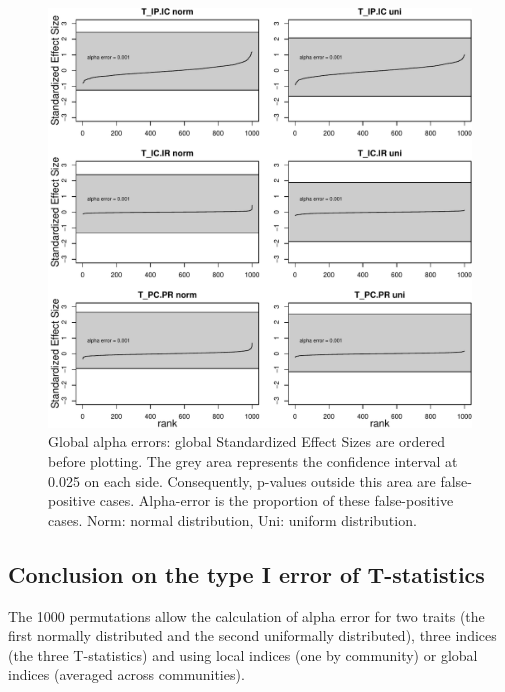 \documentclass[12pt]{article}\usepackage[]{graphicx}\usepackage[]{color}
\makeatletter
\def\maxwidth{ %
  \ifdim\Gin@nat@width>\linewidth
    \linewidth
  \else
    \Gin@nat@width
  \fi
}
\newenvironment{knitrout}{}{} %
\makeatother
\begin{document}
\begin{knitrout}
\begin{figure}
{\centering \includegraphics[width=\maxwidth]{figure/No_filter_summary_plot-1} 

}

\caption[Global alpha errors]{Global alpha errors: global Standardized Effect Sizes are ordered before plotting. The grey area represents the confidence interval at 0.025 on each side. Consequently, p-values outside this area are false-positive cases. Alpha-error is the proportion of these false-positive cases. Norm: normal distribution, Uni: uniform distribution.}\label{fig:No_filter_summary_plot}
\end{figure}


\end{knitrout}


\clearpage
  \subsection {Conclusion on the type I error of T-statistics}

The 1000 permutations allow the calculation of alpha error for two traits (the first normally distributed and the second uniformally distributed), three indices (the three T-statistics) and using local indices (one by community) or global indices (averaged across communities).
\end{document}
